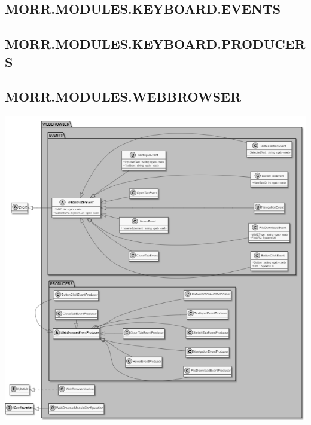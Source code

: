 \begin{packpack}
\end{packpack}

\subsection*{MORR.MODULES.KEYBOARD.EVENTS}
\begin{packclass}
\end{packclass}

\subsection*{MORR.MODULES.KEYBOARD.PRODUCERS}
\begin{packclass}
\end{packclass}

\newpage
\subsection*{MORR.MODULES.WEBBROWSER}

\begin{center}
    \includegraphics[width=1.0\textwidth]{resources/Packages/MODULES_WEBBROWSER.png}
\end{center}

